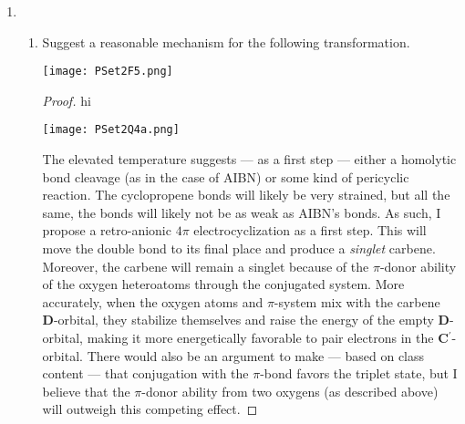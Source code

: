 \documentclass[../psets.tex]{subfiles}
\begin{document}
\begin{enumerate}
\begin{enumerate}
\begin{proof}
        \end{proof}
        \item {\color{white}hi}
        \begin{center}
            \texttt{[image: PSet2F4.png]}
        \end{center}
        \begin{proof}
            This regime is also governed by a resonance saturation effect. In both lactone and ester, the non-carbonyl oxygen will be $sp^2$-hybridized so that one of its lone pairs can conjugate with the carbonyl (specifically, the carbonyl's $\pi^*$-orbital). However, in the drawn conformation of the ester, the \emph{other} oxygen lone pair can \emph{also} delocalize through $n_{\ce{O}}\to\sigma_{\ce{C}}^*$ donation. This secondary interaction is not possible in the lactone, which is conformationally locked such that the other oxygen lone pair points away from the carbonyl's $\sigma^*$-orbital. The net effect is that the carbonyl in the lactone is less electronically saturated than the carbonyl in the ester, so the lactone anion can delocalize more effectively into the lactone carbonyl. But then the lactone can more readily stabilize the conjugate base, so 
        \end{proof}
    \end{enumerate}
    \pagebreak
    \item 
    \begin{enumerate}
        \item Suggest a reasonable mechanism for the following transformation.
        \begin{center}
            \texttt{[image: PSet2F5.png]}
        \end{center}
        \begin{proof}
            {\color{white}hi}
            \begin{center}
                \texttt{[image: PSet2Q4a.png]}
            \end{center}
            The elevated temperature suggests --- as a first step --- either a homolytic bond cleavage (as in the case of AIBN) or some kind of pericyclic reaction. The cyclopropene bonds will likely be very strained, but all the same, the bonds will likely not be as weak as AIBN's bonds. As such, I propose a retro-anionic $4\pi$ electrocyclization as a first step. This will move the double bond to its final place and produce a \emph{singlet} carbene. Moreover, the carbene will remain a singlet because of the $\pi$-donor ability of the oxygen heteroatoms through the conjugated system. More accurately, when the oxygen atoms and $\pi$-system mix with the carbene \textbf{D}-orbital, they stabilize themselves and raise the energy of the empty \textbf{D}-orbital, making it more energetically favorable to pair electrons in the \textbf{C${}^{\bm{\prime}}$}-orbital. There would also be an argument to make --- based on class content --- that conjugation with the $\pi$-bond favors the triplet state, but I believe that the $\pi$-donor ability from two oxygens (as described above) will outweigh this competing effect.\par

\end{proof}
\end{enumerate}
\end{enumerate}
\end{document}
